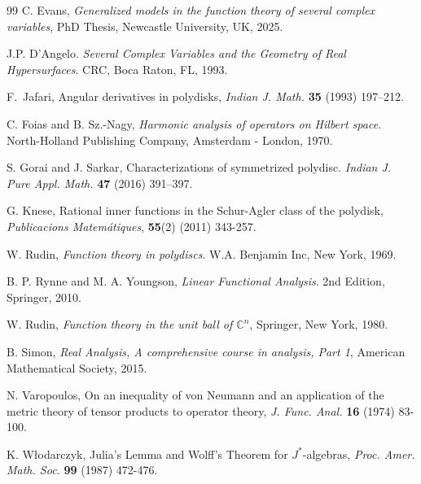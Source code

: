 \documentclass[11pt, reqno]{amsart}
\newcommand\1{\boldsymbol {1}}
\newcommand{\C}{\mathbb{C}}
\numberwithin{equation}{section}
\begin{document}
\begin{thebibliography}{99}
 C. Evans, {\em Generalized models in the function
theory of several complex variables}, PhD Thesis, Newcastle University, UK, 2025.

 J.P. D’Angelo. {\em{Several Complex Variables and the Geometry of Real Hypersurfaces}}. CRC, Boca Raton, FL, 1993.

 F.~Jafari,  Angular derivatives in polydisks,
{\em Indian J. Math.} {\bf 35} (1993) 197--212.

 C. Foias and B. Sz.-Nagy, {\it{Harmonic analysis of operators on Hilbert space}.} North-Holland Publishing Company, Amsterdam - London, 1970.

 S. Gorai and J. Sarkar, Characterizations of symmetrized polydisc. {\it{Indian J. Pure Appl. Math.}} {\bf 47} (2016) 391–397.
 
 G. Knese, Rational inner functions in the Schur-Agler class of the polydisk, {\em Publicacions Matem\'{a}tiques}, {\bf 55}(2) (2011) 343-257.

 W. Rudin, {\it{Function theory in polydiscs}}. W.A. Benjamin Inc, New York, 1969.

 B. P. Rynne and M. A. Youngson, {\it Linear Functional Analysis}. 2nd Edition, Springer, 2010.

W. Rudin,  {\em Function theory in the unit ball of $\C^n$},  Springer, New York, 1980.

 B. Simon, {\it{Real Analysis, A comprehensive course in analysis, Part 1}}, American Mathematical Society, 2015.

 N. Varopoulos, On an inequality of von Neumann and an application of the metric theory of tensor products to operator theory, {\it J. Func. Anal.} {\bf 16} (1974) 83-100.

K. W\l odarczyk,  Julia's Lemma and Wolff's Theorem for $J^*$-algebras,
 {\em Proc. Amer. Math. Soc.} {\bf 99} (1987) 472-476.
\end{thebibliography}
\end{document}
